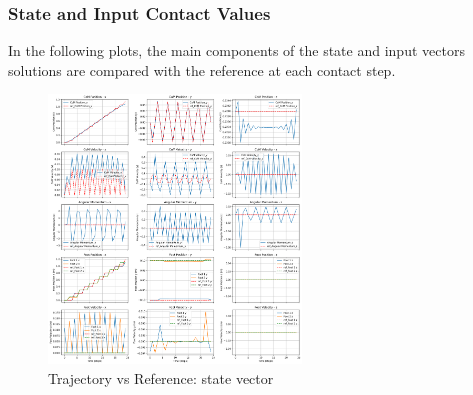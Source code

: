 \documentclass[main.tex]{subfiles}
\begin{document}
\subsubsection*{State and Input Contact Values}
In the following plots, the main components of the state and input vectors solutions are compared with the reference at each contact step.
\begin{figure}[htbp]
    \centering
    \includegraphics[width=0.6\textwidth]{figures/contact_x_walking.png}
    \caption{Trajectory vs Reference: state vector}
    \label{fig:contact_x_walking}
\end{figure}
\end{document}
